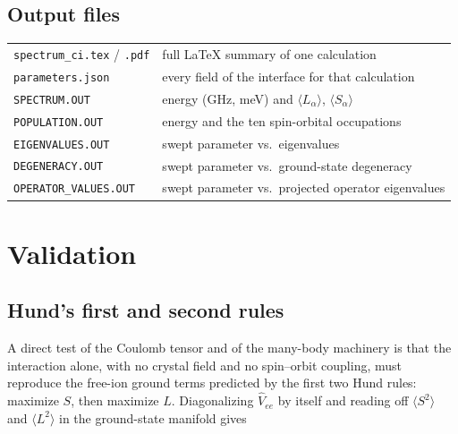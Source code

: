\documentclass[11pt,a4paper]{article}
\newcommand{\op}[1]{\texttt{#1}}
\begin{document}
\subsection{Output files}

\begin{center}
\begin{tabular}{ll}
\toprule
\op{spectrum\_ci.tex} / \op{.pdf} & full \LaTeX{} summary of one calculation\\
\op{parameters.json}    & every field of the interface for that calculation\\
\op{SPECTRUM.OUT}      & energy (GHz, meV) and $\langle L_\alpha\rangle$, $\langle S_\alpha\rangle$\\
\op{POPULATION.OUT}    & energy and the ten spin-orbital occupations\\
\op{EIGENVALUES.OUT}   & swept parameter vs.\ eigenvalues\\
\op{DEGENERACY.OUT}    & swept parameter vs.\ ground-state degeneracy\\
\op{OPERATOR\_VALUES.OUT} & swept parameter vs.\ projected operator eigenvalues\\
\bottomrule
\end{tabular}
\end{center}

\section{Validation}
\label{sec:validation}

\subsection{Hund's first and second rules}

A direct test of the Coulomb tensor and of the many-body machinery is that the
interaction alone, with no crystal field and no spin--orbit coupling, must
reproduce the free-ion ground terms predicted by the first two Hund rules:
maximize $S$, then maximize $L$.  Diagonalizing $\hat V_{ee}$ by itself and
reading off $\langle S^2\rangle$ and $\langle L^2\rangle$ in the ground-state
manifold gives
\end{document}
